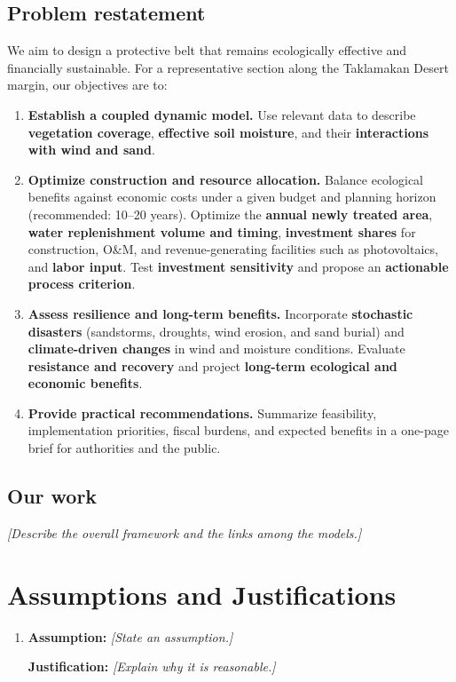 \documentclass{mcmthesis}
\newcommand{\placeholder}[1]{\par\noindent\textit{[#1]}\par}
\begin{document}
\subsection{Problem restatement}
We aim to design a protective belt that remains ecologically effective and
financially sustainable. For a representative section along the Taklamakan Desert
margin, our objectives are to:
\begin{enumerate}
  \item \textbf{Establish a coupled dynamic model.}
  Use relevant data to describe \textbf{vegetation coverage},
  \textbf{effective soil moisture}, and their \textbf{interactions with wind and sand}.

  \item \textbf{Optimize construction and resource allocation.}
  Balance ecological benefits against economic costs under a given budget and
  planning horizon (recommended: 10--20 years). Optimize the
  \textbf{annual newly treated area}, \textbf{water replenishment volume and timing},
  \textbf{investment shares} for construction, O\&M, and revenue-generating facilities
  such as photovoltaics, and \textbf{labor input}. Test \textbf{investment sensitivity}
  and propose an \textbf{actionable process criterion}.

  \item \textbf{Assess resilience and long-term benefits.}
  Incorporate \textbf{stochastic disasters} (sandstorms, droughts, wind erosion,
  and sand burial) and \textbf{climate-driven changes} in wind and moisture conditions.
  Evaluate \textbf{resistance and recovery} and project
  \textbf{long-term ecological and economic benefits}.

  \item \textbf{Provide practical recommendations.}
  Summarize feasibility, implementation priorities, fiscal burdens, and expected
  benefits in a one-page brief for authorities and the public.
\end{enumerate}
\subsection{Our work}
\placeholder{Describe the overall framework and the links among the models.}

\clearpage
\section{Assumptions and Justifications}
\begin{enumerate}
  \item \textbf{Assumption:} \textit{[State an assumption.]}

  \textbf{Justification:} \textit{[Explain why it is reasonable.]}
\end{enumerate}
\end{document}

